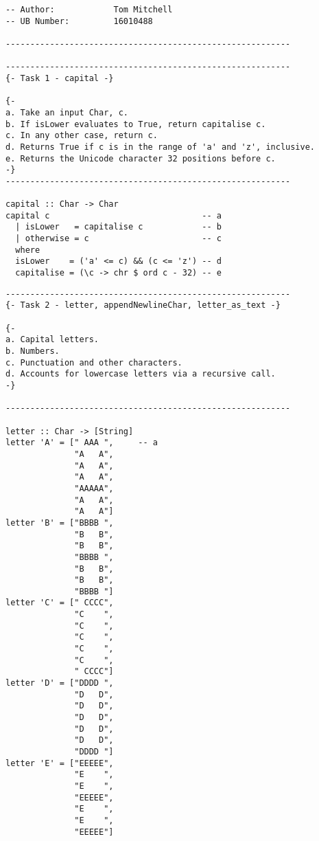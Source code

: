 \documentclass[11pt]{article}
\begin{document}
{\begin{verbatim}
-- Author:            Tom Mitchell
-- UB Number:         16010488

----------------------------------------------------------

----------------------------------------------------------
{- Task 1 - capital -}

{-
a. Take an input Char, c.
b. If isLower evaluates to True, return capitalise c.
c. In any other case, return c.
d. Returns True if c is in the range of 'a' and 'z', inclusive.
e. Returns the Unicode character 32 positions before c.
-}
----------------------------------------------------------

capital :: Char -> Char                       
capital c                               -- a     
  | isLower   = capitalise c            -- b       
  | otherwise = c                       -- c      
  where 
  isLower    = ('a' <= c) && (c <= 'z') -- d
  capitalise = (\c -> chr $ ord c - 32) -- e
\end{verbatim}
\newpage
\begin{verbatim}
----------------------------------------------------------
{- Task 2 - letter, appendNewlineChar, letter_as_text -}

{-
a. Capital letters.
b. Numbers.
c. Punctuation and other characters.
d. Accounts for lowercase letters via a recursive call.
-}

----------------------------------------------------------

letter :: Char -> [String]
letter 'A' = [" AAA ",     -- a
              "A   A",
              "A   A",
              "A   A",
              "AAAAA",
              "A   A",
              "A   A"]
letter 'B' = ["BBBB ",
              "B   B",
              "B   B",
              "BBBB ",
              "B   B",
              "B   B",
              "BBBB "]
letter 'C' = [" CCCC",
              "C    ",
              "C    ",
              "C    ",
              "C    ",
              "C    ",
              " CCCC"]
letter 'D' = ["DDDD ",
              "D   D",
              "D   D",
              "D   D",
              "D   D",
              "D   D",
              "DDDD "]
letter 'E' = ["EEEEE",
              "E    ",
              "E    ",
              "EEEEE",
              "E    ",
              "E    ",
              "EEEEE"]              


\end{verbatim}}
\end{document}
